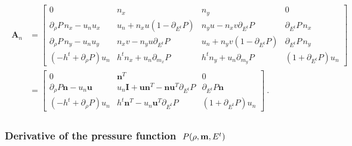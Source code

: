 \documentclass[letterpaper,10pt,english]{jupyterBook}
\begin{document}
\begin{equation*}
\begin{split}\begin{aligned}
\mathbf{A}_n
& =
\begin{bmatrix}
  0 & n_x & n_y & 0 \\
  \partial_\rho P \, n_x - u_n u_x & u_n + n_x u ( 1 - \partial_{E^t} P ) &       n_y u - n_x v \partial_{E^t} P & \partial_{E^t} P \, n_x \\
  \partial_\rho P \, n_y - u_n u_y &       n_x v - n_y u \partial_{E^t} P & u_n + n_y v ( 1 - \partial_{E^t} P ) & \partial_{E^t} P \, n_y \\
  ( - h^t + \partial_\rho P ) u_n & h^t n_x + u_n \partial_{m_x} P & h^t n_y + u_n \partial_{m_y} P & \left( 1 + \partial_{E^t} P \right) u_n
\end{bmatrix} \\
& =
\begin{bmatrix}
  0 & \mathbf{n}^T & 0 \\
  \partial_\rho P \mathbf{n} - u_n \mathbf{u} & u_n \mathbf{I} + \mathbf{u} \mathbf{n}^T - \mathbf{n} \mathbf{u}^T \partial_{E^t} P & \partial_{E^t} P \mathbf{n} \\
  ( - h^t + \partial_\rho P ) u_n & h^t \mathbf{n}^T - u_n \mathbf{u}^T \partial_{E^t} P & \left( 1 + \partial_{E^t} P \right) u_n
\end{bmatrix} \ .
\end{aligned}\end{split}
\end{equation*}\subsubsection*{Derivative of the pressure function \protect\(\ P(\rho, \mathbf{m}, E^t)\protect\)}
\end{document}
